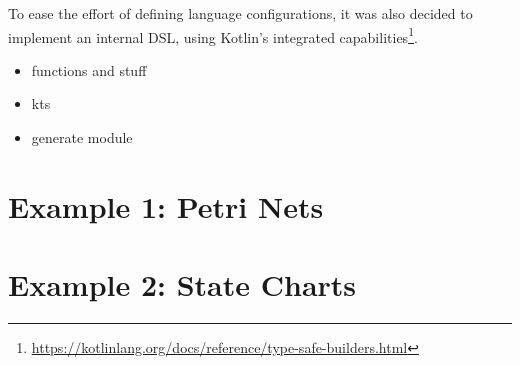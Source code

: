 To ease the effort of defining language configurations, it was also decided to implement an internal DSL, using Kotlin's integrated capabilities\footnote{\url{https://kotlinlang.org/docs/reference/type-safe-builders.html}}.




\begin{itemize}
  \item functions and stuff
  \item kts
  \item generate module
\end{itemize}


\section{Example 1: Petri Nets}



\section{Example 2: State Charts}
